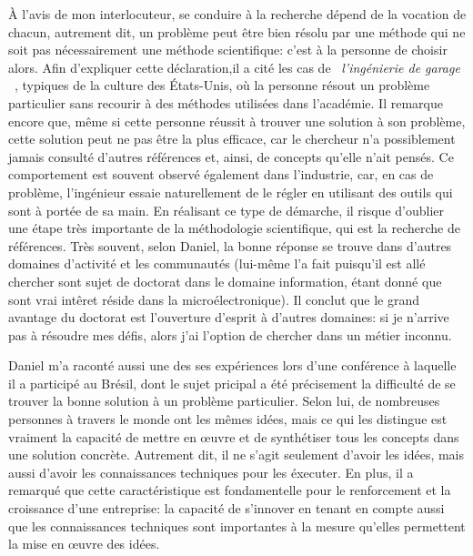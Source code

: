 \documentclass{article}
\begin{document}
À l'avis de mon interlocuteur, se conduire à la recherche dépend
de la vocation de chacun, autrement dit, un problème peut être bien résolu par
une méthode qui ne soit pas nécessairement une méthode scientifique: c'est à la
personne de choisir alors. Afin d'expliquer cette déclaration,il a cité les cas
de ~\og \textit{l'ingénierie de garage} ~\fg, typiques de la culture des
États-Unis, où la personne résout un problème particulier sans
recourir à des méthodes utilisées dans l'académie. Il remarque encore que, même
si cette personne réussit à trouver une solution à son problème, cette solution
peut ne pas être la plus efficace, car le \og chercheur \fg n'a
possiblement jamais consulté d'autres références et, ainsi, de concepts qu'elle
n'ait pensés. Ce comportement est souvent observé également dans l'industrie,
car, en cas de problème, l'ingénieur essaie naturellement de le régler en
utilisant des outils qui sont à portée de sa main. En réalisant ce type de
démarche, il risque d'oublier une étape très importante de la méthodologie
scientifique, qui est la recherche de références. Très souvent, selon Daniel,
la bonne réponse se trouve dans d'autres domaines d'activité et les communautés
(lui-même l'a fait puisqu'il est allé chercher sont sujet de doctorat dans le
domaine information, étant donné que sont vrai intêret réside dans la microélectronique).
Il conclut que le grand avantage du doctorat est l'ouverture d'esprit à
d'autres domaines: si je n'arrive pas à résoudre mes défis, alors j'ai l'option
de chercher dans un métier inconnu.

\vspace{12pt}

Daniel m'a raconté aussi une des ses expériences lors d'une conférence à
laquelle il a participé au Brésil, dont le sujet pricipal a été
précisement la difficulté de se trouver la bonne solution à un
problème particulier. Selon lui, de nombreuses personnes à travers le monde ont
les mêmes idées, mais ce qui les distingue est vraiment la capacité de mettre en
\oe uvre et de synthétiser tous les concepts dans une solution concrète.
Autrement dit, il ne s'agit seulement d'avoir les idées, mais aussi d'avoir les
connaissances techniques pour les éxecuter. En plus, il a remarqué que cette
caractéristique est fondamentelle pour le renforcement et la croissance d'une
entreprise: la capacité de s'innover en tenant en compte aussi que les
connaissances techniques sont importantes à la mesure qu'elles permettent la
mise en œuvre des idées.

\vspace{12pt} 
\end{document}
